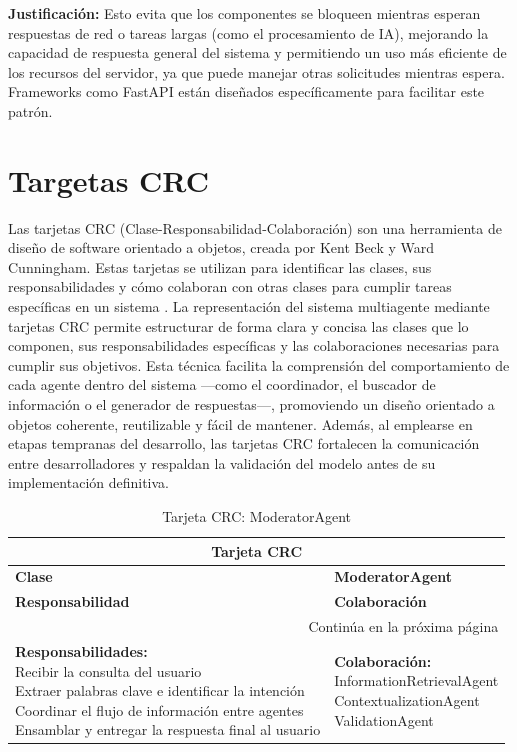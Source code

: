 \textbf{Justificación:} Esto evita que los componentes se bloqueen mientras esperan respuestas de red o tareas largas (como el procesamiento de IA), mejorando la capacidad de respuesta general del sistema y permitiendo un uso más eficiente de los recursos del servidor, ya que puede manejar otras solicitudes mientras espera. Frameworks como FastAPI están diseñados específicamente para facilitar este patrón.


\section{Targetas CRC}

Las tarjetas CRC (Clase-Responsabilidad-Colaboración) son una herramienta de diseño de software orientado a objetos, creada por Kent Beck y Ward Cunningham. Estas tarjetas se utilizan para identificar las clases, sus responsabilidades y cómo colaboran con otras clases para cumplir tareas específicas en un sistema \cite{BeckCunningham}. La representación del sistema multiagente mediante tarjetas CRC permite estructurar de forma clara y concisa las clases que lo componen, sus responsabilidades específicas y las colaboraciones necesarias para cumplir sus objetivos. Esta técnica facilita la comprensión del comportamiento de cada agente dentro del sistema —como el coordinador, el buscador de información o el generador de respuestas—, promoviendo un diseño orientado a objetos coherente, reutilizable y fácil de mantener. Además, al emplearse en etapas tempranas del desarrollo, las tarjetas CRC fortalecen la comunicación entre desarrolladores y respaldan la validación del modelo antes de su implementación definitiva.

\begin{longtable}{|l|l|}
	\caption{Tarjeta CRC: ModeratorAgent} \label{tablacrc1} \\
	
	\hline
	\multicolumn{2}{|c|}{\textbf{Tarjeta CRC}} \\
	\hline
	\textbf{Clase} & \textbf{ModeratorAgent} \\
	\hline
	\endfirsthead
	
	\hline
	\textbf{Responsabilidad} & \textbf{Colaboración} \\
	\hline
	\endhead
	
	\hline
	\multicolumn{2}{|r|}{Continúa en la próxima página} \\
	\hline
	\endfoot
	
	\hline
	\endlastfoot
	
	\parbox[t]{0.45\linewidth}{\textbf{Responsabilidades:} \\ 
		Recibir la consulta del usuario \\ 
		Extraer palabras clave e identificar la intención \\ 
		Coordinar el flujo de información entre agentes \\ 
		Ensamblar y entregar la respuesta final al usuario} 
	& 
	\parbox[t]{0.45\linewidth}{\textbf{Colaboración:} \\
		InformationRetrievalAgent \\ 
		ContextualizationAgent \\ 
		ValidationAgent}
\end{longtable}


